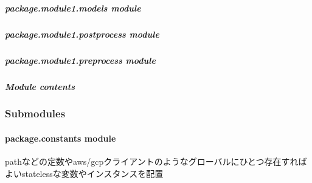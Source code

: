 \documentclass[letterpaper,10pt,dvipdfmx]{sphinxmanual}
\begin{document}
\subparagraph{package.module1.models module}
\label{\detokenize{package.module1.models:module-package.module1.models}}\label{\detokenize{package.module1.models:package-module1-models-module}}\label{\detokenize{package.module1.models::doc}}
\sphinxstepscope


\subparagraph{package.module1.postprocess module}
\label{\detokenize{package.module1.postprocess:module-package.module1.postprocess}}\label{\detokenize{package.module1.postprocess:package-module1-postprocess-module}}\label{\detokenize{package.module1.postprocess::doc}}
\sphinxstepscope


\subparagraph{package.module1.preprocess module}
\label{\detokenize{package.module1.preprocess:module-package.module1.preprocess}}\label{\detokenize{package.module1.preprocess:package-module1-preprocess-module}}\label{\detokenize{package.module1.preprocess::doc}}

\subparagraph{Module contents}
\label{\detokenize{package.module1:module-package.module1}}\label{\detokenize{package.module1:module-contents}}

\subsubsection{Submodules}
\label{\detokenize{package:submodules}}
\sphinxstepscope


\paragraph{package.constants module}
\label{\detokenize{package.constants:module-package.constants}}\label{\detokenize{package.constants:package-constants-module}}\label{\detokenize{package.constants::doc}}
\sphinxAtStartPar
pathなどの定数やaws/gcpクライアントのようなグローバルにひとつ存在すればよいstatelessな変数やインスタンスを配置
\end{document}
